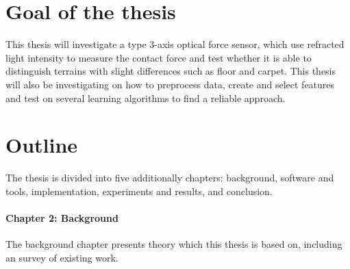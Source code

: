 \documentclass[USenglish]{ifimaster}  %
\begin{document}
\section{Goal of the thesis}
This thesis will investigate a type 3-axis optical force sensor, which use refracted light intensity to measure the contact force and test whether it is able to distinguish terrains with slight differences such as floor and carpet. This thesis will also be investigating on how to preprocess data, create and select features and test on several learning algorithms to find a reliable approach. 

\section{Outline}
The thesis is divided into five additionally chapters: background, software and tools, implementation, experiments and results, and conclusion. 
	
\paragraph{Chapter 2: Background}
The background chapter presents theory which this thesis is based on, including an survey of existing work.
\end{document}
